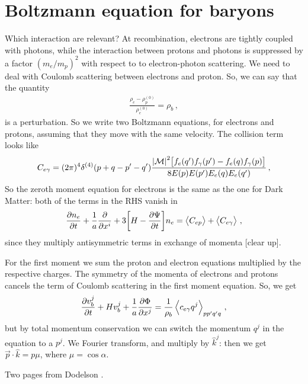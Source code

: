 \documentclass[main.tex]{subfiles}
\begin{document}
\section{Boltzmann equation for baryons}

Which interaction are relevant? 
At recombination, electrons are tightly coupled with photons, while the interaction between protons and photons is suppressed by a factor \((m_{e} / m_p)^2\) with respect to to electron-photon scattering.
We need to deal with Coulomb scattering between electrons and proton. 
So, we can say that the quantity 
%
\begin{align}
\frac{ \rho_{e} - \rho_{p}^{(0)}}{\rho_{e}^{(0)}}  =
\rho_{b}
\,,
\end{align}
%
is a perturbation. So we write two Boltzmann equations, for electrons and protons, assuming that they move with the same velocity. The collision term looks like 
%
\begin{align}
C_{e \gamma }= (2 \pi)^{4} \delta^{(4)} (p + q - p' - q') 
\frac{ \abs{\mathcal{M}}^2 \qty[f_{e}(q') f_{\gamma }(p') - f_e (q) f_\gamma (p)] }{8 E(p) E(p') E_e(q) E_e(q')}
\,,
\end{align}
%
So the zeroth moment equation for electrons is the same as the one for Dark Matter: both of the terms in the RHS vanish in
%
\begin{align}
\pdv{n_e}{t} + \frac{1}{a} \pdv{}{x^{i}} (n_e v^{i}_{b}) + 3 \qty[H - \pdv{\Psi }{t}]n_e = \expval{C_{ep}} + \expval{C_{e \gamma }}
\,,
\end{align}
%
since they multiply antisymmetric terms in exchange of momenta [clear up]. 

For the first moment we sum the proton and electron equations multiplied by the respective charges. 
The symmetry of the momenta of electrons and protons cancels the term of Coulomb scattering in the first moment equation. So, we get 
%
\begin{align}
\pdv{v^{j}_{b}}{t} + H v_b^{j} + \frac{1}{a} \pdv{\Phi }{x^{j}} 
=\frac{1}{\rho_{b}} \expval{c_{e \gamma } q^{j}}_{pp'q'q}
\,,
\end{align}
%
but by total momentum conservation we can switch the momentum \(q^{j} \) in the equation to a \(p^{j}\). 
We Fourier transform, and multiply by \(\hat{k}^{j}\): then we get \(\vec{p} \cdot \hat{k} = p \mu \), where \( \mu = \cos \alpha \). 

Two pages from Dodelson \cite[]{dodelsonModernCosmology2003}.


\end{document}
